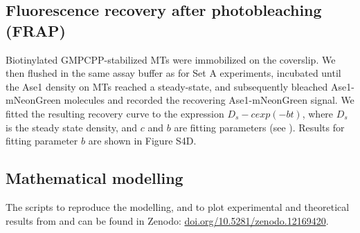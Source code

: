 \subsection{Fluorescence recovery after photobleaching (FRAP)}
Biotinylated GMPCPP-stabilized MTs were immobilized on the coverslip. We then flushed in the same assay buffer as for Set A experiments, incubated until the Ase1 density on MTs reached a steady-state, and subsequently bleached Ase1-mNeonGreen molecules and recorded the recovering Ase1-mNeonGreen signal. We fitted the resulting recovery curve to the expression $D_s - c exp(-bt)$, where $D_s$ is the steady state density, and $c$ and $b$ are fitting parameters (see ). Results for fitting parameter $b$ are shown in Figure S4D.

\subsection{Mathematical modelling}
The scripts to reproduce the modelling, and to plot experimental and theoretical results from  and  can be found in Zenodo: \url{doi.org/10.5281/zenodo.12169420}. 
